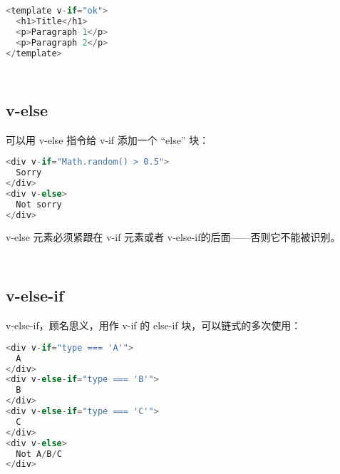 \begin{lstlisting}[language=JavaScript]
<template v-if="ok">
  <h1>Title</h1>
  <p>Paragraph 1</p>
  <p>Paragraph 2</p>
</template>
\end{lstlisting}



\begin{lstlisting}[language=JavaScript]

\end{lstlisting}



\begin{lstlisting}[language=JavaScript]

\end{lstlisting}


\subsection{v-else}

可以用 v-else 指令给 v-if 添加一个 “else” 块：


\begin{lstlisting}[language=JavaScript]
<div v-if="Math.random() > 0.5">
  Sorry
</div>
<div v-else>
  Not sorry
</div>
\end{lstlisting}

v-else 元素必须紧跟在 v-if 元素或者 v-else-if的后面——否则它不能被识别。

\begin{lstlisting}[language=JavaScript]

\end{lstlisting}



\begin{lstlisting}[language=JavaScript]

\end{lstlisting}


\subsection{v-else-if}

v-else-if，顾名思义，用作 v-if 的 else-if 块，可以链式的多次使用：

\begin{lstlisting}[language=JavaScript]
<div v-if="type === 'A'">
  A
</div>
<div v-else-if="type === 'B'">
  B
</div>
<div v-else-if="type === 'C'">
  C
</div>
<div v-else>
  Not A/B/C
</div>
\end{lstlisting}

